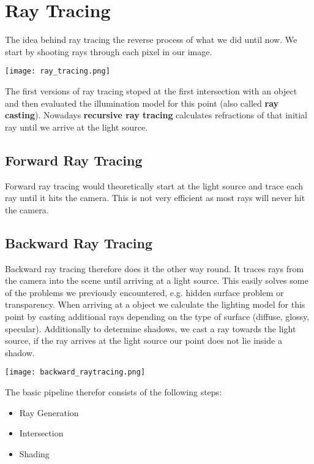 \section{Ray Tracing}

The idea behind ray tracing the reverse process of what we did until now. We start by shooting rays through each pixel in our image.
\begin{center}
	\texttt{[image: ray\_tracing.png]}
\end{center}

The first versions of ray tracing stoped at the first intersection with an object and then evaluated the illumination model for this point (also called \textbf{ray casting}). Nowadays \textbf{recursive ray tracing} calculates refractions of that initial ray until we arrive at the light source.


\subsection{Forward Ray Tracing}

Forward ray tracing would theoretically start at the light source and trace each ray until it hits the camera. This is not very efficient as most rays will never hit the camera.


\subsection{Backward Ray Tracing}

Backward ray tracing therefore does it the other way round. It traces rays from the camera into the scene until arriving at a light source. This easily solves some of the problems we previously encountered, e.g. hidden surface problem or transparency. When arriving at a object we calculate the lighting model for this point by casting additional rays depending on the type of surface (diffuse, glossy, specular). Additionally to determine shadows, we cast a ray towards the light source, if the ray arrives at the light source our point does not lie inside a shadow.
\begin{center}
	\texttt{[image: backward\_raytracing.png]}
\end{center}

The basic pipeline therefor consists of the following steps:
\begin{itemize}
	\item Ray Generation
	\item Intersection
	\item Shading
\end{itemize}

